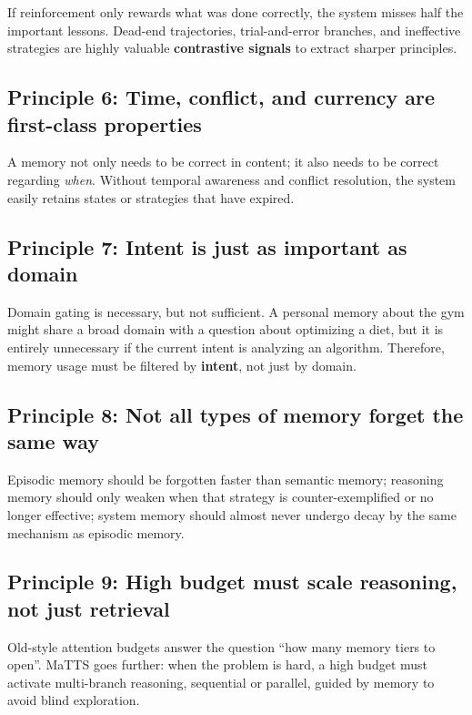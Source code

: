 \documentclass[a4paper,12pt]{article}
\begin{document}
If reinforcement only rewards what was done correctly, the system misses half the important lessons. Dead-end trajectories, trial-and-error branches, and ineffective strategies are highly valuable \textbf{contrastive signals} to extract sharper principles.

\subsection*{Principle 6: Time, conflict, and currency are first-class properties}

A memory not only needs to be correct in content; it also needs to be correct regarding \emph{when}. Without temporal awareness and conflict resolution, the system easily retains states or strategies that have expired.

\subsection*{Principle 7: Intent is just as important as domain}

Domain gating is necessary, but not sufficient. A personal memory about the gym might share a broad domain with a question about optimizing a diet, but it is entirely unnecessary if the current intent is analyzing an algorithm. Therefore, memory usage must be filtered by \textbf{intent}, not just by domain.

\subsection*{Principle 8: Not all types of memory forget the same way}

Episodic memory should be forgotten faster than semantic memory; reasoning memory should only weaken when that strategy is counter-exemplified or no longer effective; system memory should almost never undergo decay by the same mechanism as episodic memory.

\subsection*{Principle 9: High budget must scale reasoning, not just retrieval}

Old-style attention budgets answer the question ``how many memory tiers to open''. MaTTS goes further: when the problem is hard, a high budget must activate multi-branch reasoning, sequential or parallel, guided by memory to avoid blind exploration.
\end{document}
